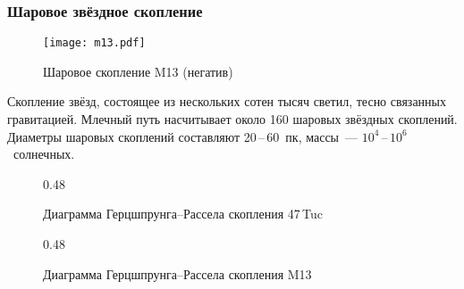 \subsubsection*{Шаровое звёздное скопление}
\begin{wrapfigure}[7]{r}{0.32\tw}
    \vspace{-1pc}
    \centering
    \texttt{[image: m13.pdf]}
    \caption{Шаровое скопление M13 (негатив)}
\end{wrapfigure}
Скопление звёзд, состоящее из нескольких сотен тысяч светил, тесно связанных гравитацией. Млечный путь насчитывает около 160 шаровых звёздных скоплений. Диаметры шаровых скоплений составляют 20\,--\,60~пк, массы~--- $10^4$\,--\,$10^6$~солнечных.

\begin{figure}[h!]
    \begin{subcaptionblock}{0.48\tw}
        \centering
        \caption{Диаграмма Герцшпрунга--Рассела скопления 47\,Tuc}
    \end{subcaptionblock}
    \hfill
    \begin{subcaptionblock}{0.48\tw}
        \centering
        \caption{Диаграмма Герцшпрунга--Рассела скопления M13}
    \end{subcaptionblock}
    \caption{}
\end{figure}

